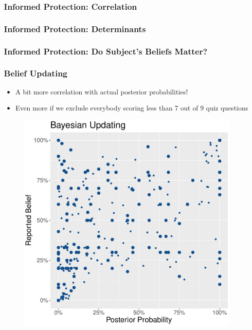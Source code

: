 \documentclass[11pt,hyperref={bookmarks=false}]{beamer}
\begin{document}
\begin{frame}
\frametitle{Informed Protection: Correlation}
\footnotesize


\end{frame}



\begin{frame}
\frametitle{Informed Protection: Determinants}
\footnotesize

\end{frame}


\begin{frame}
\frametitle{Informed Protection: Do Subject's Beliefs Matter?}
\footnotesize

\end{frame}




\begin{frame}
\frametitle{Belief Updating}
\begin{itemize}
\item A bit more correlation with actual posterior probabilities!
\item Even more if we exclude everybody scoring less than 7 out of 9 quiz questions
\end{itemize}
\begin{figure}[h]
\includegraphics[scale=0.4]{Graphs/UPD_curve2.pdf}
\end{figure}
\end{frame}
\end{document}
